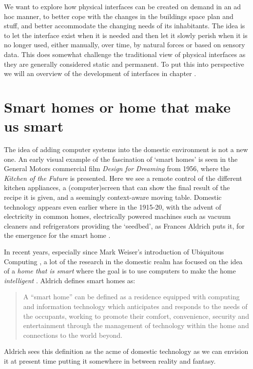 We want to explore how physical interfaces can be created on demand in an ad hoc manner, to better cope with the changes in the buildings space plan and stuff, and better accommodate the changing needs of its inhabitants.
The idea is to let the interface exist when it is needed and then let it slowly perish when it is no longer used, either manually, over time, by natural forces or based on sensory data.
This does somewhat challenge the traditional view of physical interfaces as they are generally considered static and permanent.
To put this into perspective we will an overview of the development of interfaces in chapter .

\section{Smart homes or home that make us smart}
The idea of adding computer systems into the domestic environment is not a new one. An early visual example of the fascination of `smart homes' is seen in the General Motors commercial film \emph{Design for Dreaming} from 1956, where the \emph{Kitchen of the Future} is presented.
Here we see a remote control of the different kitchen appliances, a (computer)screen that can show the final result of the recipe it is given, and a seemingly context-aware moving table.
Domestic technology appears even earlier where in the 1915-20, with the advent of electricity in common homes, electrically powered machines such as vacuum cleaners and refrigerators providing the `seedbed', as Frances Aldrich puts it, for the emergence for the smart home \citep{aldrich2003smart}.

In recent years, especially since Mark Weiser's introduction of Ubiquitous Computing \citep{weiser1991computer}, a lot of the research in the domestic realm has focused on the idea of a \emph{home that is smart} where the goal is to use computers to make the home \emph{intelligent} \citep{taylor2007homes}.
Aldrich \citep{aldrich2003smart} defines smart homes as:

\begin{quotation}
A ``smart home'' can be defined as a residence equipped with computing and information technology which anticipates and responds to the needs of the occupants, working to promote their comfort, convenience, security and entertainment through the management of technology within the home and connections to the world beyond.
\end{quotation}
Aldrich sees this definition as the acme of domestic technology as we can envision it at present time putting it somewhere in between reality  and fantasy. 

